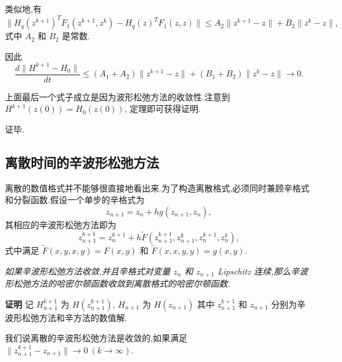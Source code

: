 类似地,有
\begin{equation*}
\|H_q(z^{k+1})^TF_1(z^{k+1},z^{k})-H_q(z)^TF_1(z,z)\|\le A_2\|z^{k+1}-z\|+B_2\|z^{k}-z\|,
\end{equation*}
式中 $A_2$ 和 $B_2$ 是常数.

因此
\begin{equation*}
\frac{d\|H^{k+1}-H_0\|}{dt}\le (A_1+A_2)\|z^{k+1}-z\|+(B_1+B_2)\|z^{k}-z\| \to 0.
\end{equation*}

上面最后一个式子成立是因为波形松弛方法的收敛性.注意到 $H^{k+1}(z(0))=H_0(z(0))$, 定理即可获得证明.

证毕.

\subsection{离散时间的辛波形松弛方法}
离散的数值格式并不能够很直接地看出来.为了构造离散格式,必须同时兼顾辛格式和分裂函数.假设一个单步的辛格式为
\begin{equation*}
z_{n+1}=z_{n}+h g(z_{n+1},z_{n}),
\end{equation*}
其相应的辛波形松弛方法即为
\begin{equation}\label{eq:discrete}
z_{n+1}^{k+1}=z_{n}^{k+1}+h \tilde{F}(z_{n+1}^{k+1},z_{n+1}^{k},z_{n}^{k+1},z_{n}^{k}),
\end{equation}
式中满足 $\tilde{F}(x,y,x,y)=F(x,y)$ 和 $\tilde{F}(x,x,y,y)=g(x,y)$.

\begin{theorem}
\emph{如果辛波形松弛方法收敛,并且辛格式对变量 $z_{n}$ 和 $z_{n+1}$ Lipschitz 连续,那么辛波形松弛方法的哈密尔顿函数收敛到离散格式的哈密尔顿函数.}
\end{theorem}

{\textbf{证明}} 记 $H^{k+1}_{n+1}$ 为 $H(z_{n+1}^{k+1})$, $H_{n+1}$ 为 $H(z_{n+1})$ 其中 $z_{n+1}^{k+1}$ 和 $z_{n+1}$ 分别为辛波形松弛方法和辛方法的数值解.

我们说离散的辛波形松弛方法是收敛的,如果满足 $\|z_{n+1}^{k+1} - z_{n+1}\| \to 0~(k \to \infty)$.


